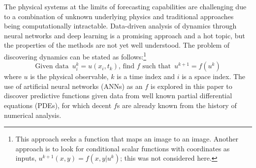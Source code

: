 \documentclass{article}
\begin{document}
The physical systems at the limits of forecasting capabilities are challenging
due to a combination of unknown underlying physics and
traditional approaches being computationally intractable. Data-driven analysis of dynamics 
through neural networks and deep learning is a promising approach and
a hot topic, but the properties of the methods are not yet well understood. The problem of discovering dynamics can be stated as follows:\footnote{This approach seeks a
  function that maps an image to an image. Another approach is to look
  for conditional scalar functions with coordinates as inputs,
  $u^{k+1}(x,y)=f(x,y|u^{k})$; this was not considered here. }
\begin{equation}
\textrm{Given data }\, u_i^k=u(x_i,t_k), \,\textrm{find }f\textrm{ such that }\, u^{k+1}=f(u^k)
\end{equation}
where $u$ is the physical observable, $k$ is a time index and $i$ is a space index. The use of artificial neural networks
(ANNs) as an $f$ is explored in this paper to
discover predictive functions given data from well known partial differential
equations (PDEs), for which
decent $f$s are already known from the history of numerical analysis.




\end{document}
